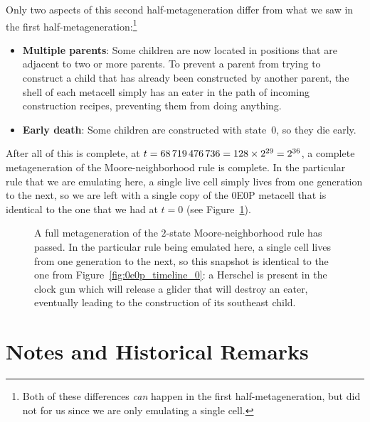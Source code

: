 Only two aspects of this second half-metageneration differ from what we saw in the first half-metageneration:\footnote{Both of these differences \emph{can} happen in the first half-metageneration, but did not for us since we are only emulating a single cell.}\smallskip

\begin{itemize}
	\item \textbf{Multiple parents}: Some children are now located in positions that are adjacent to two or more parents. To prevent a parent from trying to construct a child that has already been constructed by another parent, the shell of each metacell simply has an eater in the path of incoming construction recipes, preventing them from doing anything.\smallskip
	
	\item \textbf{Early death}: Some children are constructed with state~$0$, so they die early.\smallskip
\end{itemize}

After all of this is complete, at $t = 68{\,}719{\,}476{\,}736 = 128 \times 2^{29} = 2^{36}$, a complete metageneration of the Moore-neighborhood rule is complete. In the particular rule that we are emulating here, a single live cell simply lives from one generation to the next, so we are left with a single copy of the 0E0P metacell that is identical to the one that we had at $t = 0$ (see Figure~\ref{fig:0e0p_timeline_68719476736}).

\begin{figure}[!htb]
	\centering
	\caption{A full metageneration of the $2$-state Moore-neighborhood rule has passed. In the particular rule being emulated here, a single cell lives from one generation to the next, so this snapshot is identical to the one from Figure~\ref{fig:0e0p_timeline_0}: a Herschel is present in the clock gun which will release a glider that will destroy an eater, eventually leading to the construction of its southeast child.}
	\label{fig:0e0p_timeline_68719476736}
\end{figure}



\clearpage

\section{Notes and Historical Remarks}\label{sec:0e0p_history}

